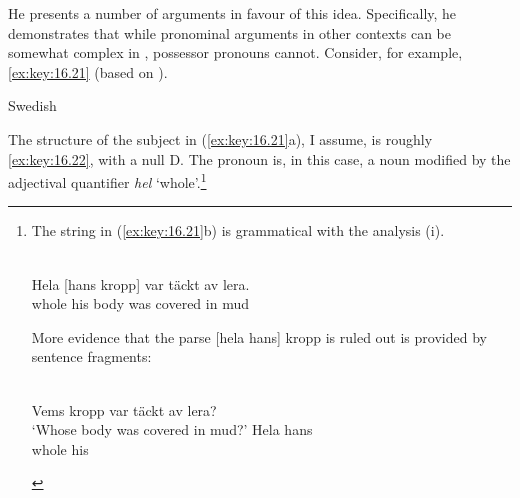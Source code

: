 \documentclass[output=paper]{langsci/langscibook}
\begin{document}
\ea\label{ex:key:16.20}
    \ea
    \ex
    \z
\z

He presents a number of arguments in favour of this idea.  Specifically, he
demonstrates that while pronominal arguments in other contexts can be somewhat
complex in , possessor pronouns cannot. Consider, for example, \eqref{ex:key:16.21}
(based on \citealt{Delsing1998}).\newpage

\ea Swedish\label{ex:key:16.21}
	\z
\z

The structure of the subject in (\ref{ex:key:16.21}a), I assume, is roughly \eqref{ex:key:16.22}, with a null
D.  The pronoun is, in this case, a noun modified by the adjectival quantifier
\emph{hel} `whole'.\footnote{The string in (\ref{ex:key:16.21}b) is grammatical with the
    analysis (i).

\begin{exe}
    \\
	\gll Hela   [hans kropp] var täckt av lera.\\
		whole his    body    was covered in mud\\
	\glt
\end{exe}

More evidence that the parse [hela hans] kropp is ruled out is provided by
sentence fragments:

\begin{exe}
    \\
    Vems kropp var täckt av lera?\\
        `Whose body was covered in mud?'
    \llap{*}
		\gll Hela hans\\
            whole his\\
\end{exe}}
\end{document}
